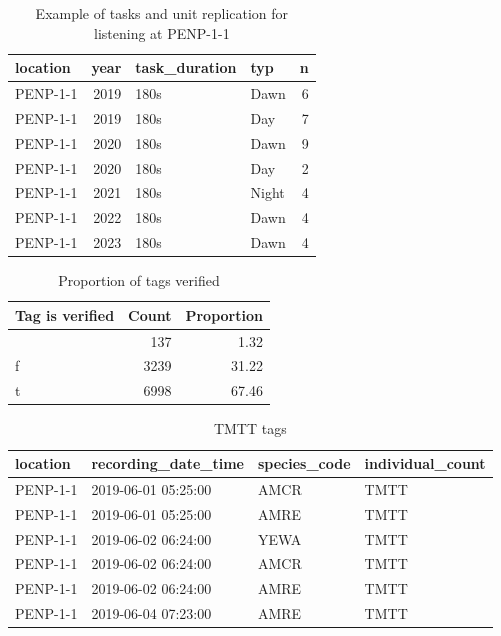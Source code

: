\documentclass[
  letterpaper,
  DIV=11,
  numbers=noendperiod,
  oneside]{scrartcl}
\begin{document}
\hypertarget{tbl-loc-repl}{}
\begin{table}
\caption{\label{tbl-loc-repl}Example of tasks and unit replication for listening at PENP-1-1 }\tabularnewline

\centering
\begin{tabular}{l|r|l|l|r}
\hline
location & year & task\_duration & typ & n\\
\hline
PENP-1-1 & 2019 & 180s & Dawn & 6\\
\hline
PENP-1-1 & 2019 & 180s & Day & 7\\
\hline
PENP-1-1 & 2020 & 180s & Dawn & 9\\
\hline
PENP-1-1 & 2020 & 180s & Day & 2\\
\hline
PENP-1-1 & 2021 & 180s & Night & 4\\
\hline
PENP-1-1 & 2022 & 180s & Dawn & 4\\
\hline
PENP-1-1 & 2023 & 180s & Dawn & 4\\
\hline
\end{tabular}
\end{table}

\hypertarget{tbl-verified}{}
\begin{table}
\caption{\label{tbl-verified}Proportion of tags verified }\tabularnewline

\centering
\begin{tabular}{l|r|r}
\hline
Tag is verified & Count & Proportion\\
\hline
 & 137 & 1.32\\
\hline
f & 3239 & 31.22\\
\hline
t & 6998 & 67.46\\
\hline
\end{tabular}
\end{table}

\hypertarget{tbl-tmtt}{}
\begin{table}
\caption{\label{tbl-tmtt}TMTT tags }\tabularnewline

\centering
\begin{tabular}{l|l|l|l}
\hline
location & recording\_date\_time & species\_code & individual\_count\\
\hline
PENP-1-1 & 2019-06-01 05:25:00 & AMCR & TMTT\\
\hline
PENP-1-1 & 2019-06-01 05:25:00 & AMRE & TMTT\\
\hline
PENP-1-1 & 2019-06-02 06:24:00 & YEWA & TMTT\\
\hline
PENP-1-1 & 2019-06-02 06:24:00 & AMCR & TMTT\\
\hline
PENP-1-1 & 2019-06-02 06:24:00 & AMRE & TMTT\\
\hline
PENP-1-1 & 2019-06-04 07:23:00 & AMRE & TMTT\\
\hline
\end{tabular}
\end{table}
\end{document}
